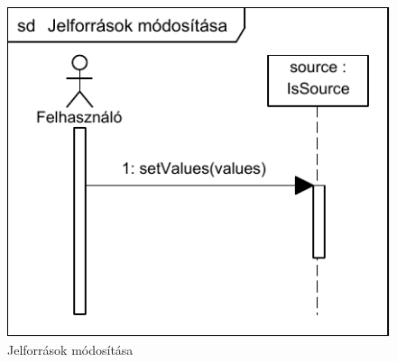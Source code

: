 \begin{figure}[H]
\begin{center}
\includegraphics{chapters/chapter04/seqdiagrams/jelforrasok_modositasa.pdf}
\caption{Jelforrások módosítása}
\label{fig:jelforrasok_modositasa}
\end{center}
\end{figure}




